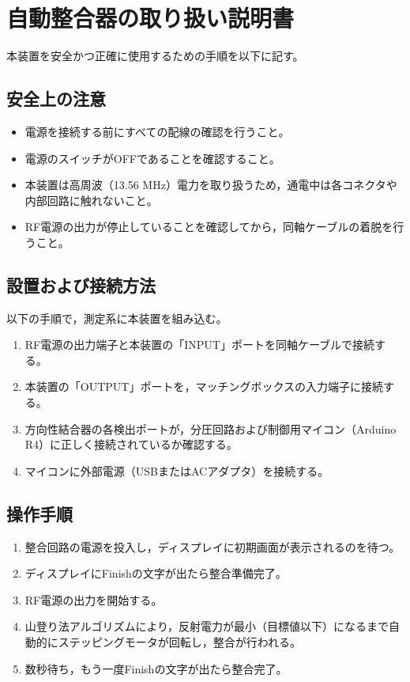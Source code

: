 \documentclass[uplatex, 12pt,oneside,openany]{ujbook}
\begin{document}



\appendix
\chapter{自動整合器の取り扱い説明書}
本装置を安全かつ正確に使用するための手順を以下に記す。

\section{安全上の注意}
\begin{itemize}
    \item 電源を接続する前にすべての配線の確認を行うこと。
    \item 電源のスイッチがOFFであることを確認すること。
    \item 本装置は高周波（13.56 MHz）電力を取り扱うため，通電中は各コネクタや内部回路に触れないこと。
    \item RF電源の出力が停止していることを確認してから，同軸ケーブルの着脱を行うこと。
\end{itemize}

\section{設置および接続方法}
以下の手順で，測定系に本装置を組み込む。
\begin{enumerate}
    \item RF電源の出力端子と本装置の「INPUT」ポートを同軸ケーブルで接続する。
    \item 本装置の「OUTPUT」ポートを，マッチングボックスの入力端子に接続する。
    \item 方向性結合器の各検出ポートが，分圧回路および制御用マイコン（Arduino R4）に正しく接続されているか確認する。
    \item マイコンに外部電源（USBまたはACアダプタ）を接続する。
\end{enumerate}

\section{操作手順}
\begin{enumerate}
    \item 整合回路の電源を投入し，ディスプレイに初期画面が表示されるのを待つ。
    \item ディスプレイにFinishの文字が出たら整合準備完了。
    \item RF電源の出力を開始する。
    \item 山登り法アルゴリズムにより，反射電力が最小（目標値以下）になるまで自動的にステッピングモータが回転し，整合が行われる。
    \item 数秒待ち，もう一度Finishの文字が出たら整合完了。
\end{enumerate}
\end{document}
